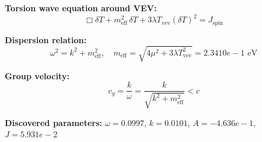 
\textbf{Torsion wave equation around VEV:}
\begin{equation}
  \Box \delta T + m_{\text{eff}}^2 \, \delta T + 3\lambda T_{\text{vev}} (\delta T)^2 = J_{\text{spin}}
\end{equation}

\textbf{Dispersion relation:}
\begin{equation}
  \omega^2 = k^2 + m_{\text{eff}}^2, \quad
  m_{\text{eff}} = \sqrt{4\mu^2 + 3\lambda T_{\text{vev}}^2} = 2.3410e-1 \text{ eV}
\end{equation}

\textbf{Group velocity:}
\begin{equation}
  v_g = \frac{k}{\omega} = \frac{k}{\sqrt{k^2 + m_{\text{eff}}^2}} < c
\end{equation}

\textbf{Discovered parameters:}
$\omega = 0.0997$, \quad
$k = 0.0101$, \quad
$A = -4.636e-1$, \quad
$J = 5.931e-2$